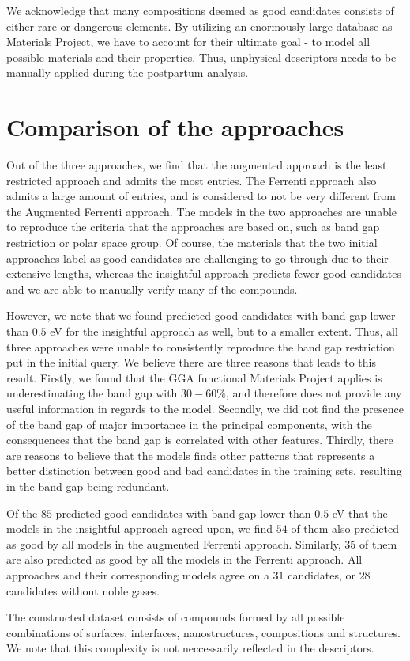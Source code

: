 We acknowledge that many compositions deemed as good candidates consists of either rare or dangerous elements. By utilizing an enormously large database as Materials Project, we have to account for their ultimate goal - to model all possible materials and their properties. Thus, unphysical descriptors needs to be manually applied during the postpartum analysis.


\section{Comparison of the approaches}

Out of the three approaches, we find that the augmented approach is the least restricted approach and admits the most entries. The Ferrenti approach also admits a large amount of entries, and is considered to not be very different from the Augmented Ferrenti approach. The models in the two approaches are unable to reproduce the criteria that the approaches are based on, such as band gap restriction or polar space group. Of course, the materials that the two initial approaches label as good candidates are challenging to go through due to their extensive lengths, whereas the insightful approach predicts fewer good candidates and we are able to manually verify many of the compounds.

However, we note that we found predicted good candidates with band gap lower than $0.5$ eV for the insightful approach as well, but to a smaller extent. Thus, all three approaches were unable to consistently reproduce the band gap restriction put in the initial query. We believe there are three reasons that leads to this result. Firstly, we found that the GGA functional Materials Project applies is underestimating the band gap with $30-60\%$, and therefore does not provide any useful information in regards to the model. Secondly, we did not find the presence of the band gap of major importance in the principal components, with the consequences that the band gap is correlated with other features. Thirdly, there are reasons to believe that the models finds other patterns that represents a better distinction between good and bad candidates in the training sets, resulting in the band gap being redundant.

Of the $85$ predicted good candidates with band gap lower than $0.5$ eV that the models in the insightful approach agreed upon, we find $54$ of them also predicted as good by all models in the augmented Ferrenti approach. Similarly, $35$ of them are also predicted as good by all the models in the Ferrenti approach. All approaches and their corresponding models agree on a $31$ candidates, or $28$ candidates without noble gases.

The constructed dataset consists of compounds formed by all possible combinations of surfaces, interfaces, nanostructures, compositions and structures. We note that this complexity is not neccessarily reflected in the descriptors.


